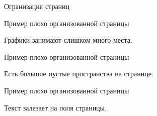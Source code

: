 \documentclass[fleqn, xcolor=x11names]{beamer}
\begin{document}
\begin{section}{Огранизация страниц}
\begin{frame}{Пример плохо организованной страницы}
    \begin{center}
    \end{center}
    Графики занимают слишком много места.
\end{frame}

\begin{frame}{Пример плохо организованной страницы}
    \begin{center}
    \end{center}
    Есть большие пустые пространства на странице.
\end{frame}

\begin{frame}{Пример плохо организованной страницы}
    \begin{center}
    \end{center}
    Текст залезает на поля страницы.
\end{frame}


\end{section}
\end{document}
